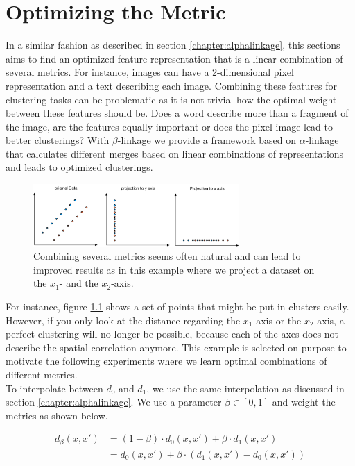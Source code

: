 \chapter{Optimizing the Metric}
\label{sec:beta}

In a similar fashion as described in section \ref{chapter:alphalinkage}, this sections aims to find an optimized feature representation that is a linear combination of several metrics. For instance, images can have a 2-dimensional pixel representation and a text describing each image. Combining these features for clustering tasks can be problematic as it is not trivial how the optimal weight between these features should be. Does a word describe more than a fragment of the image, are the features equally important or does the pixel image lead to better clusterings? With $\beta$-linkage we provide a framework based on $\alpha$-linkage that calculates different merges based on linear combinations of representations and leads to optimized clusterings.

\begin{figure}[h]
    \centering
    \includegraphics[width=0.7\textwidth]{images/ExampleDataset}
    \caption{Combining several metrics seems often natural and can lead to improved results as in this example where we project a dataset on the $x_1$- and the $x_2$-axis.}
    \label{fig:metrics}
\end{figure}

For instance, figure \ref{fig:metrics} shows a set of points that might be put in clusters easily. However, if you only look at the distance regarding the $x_1$-axis or the $x_2$-axis, a perfect clustering will no longer be possible, because each of the axes does not describe the spatial correlation anymore. This example is selected on purpose to motivate the following experiments where we learn optimal combinations of different metrics.\\ 

To interpolate between $d_0$ and $d_1$, we use the same interpolation as discussed in section \ref{chapter:alphalinkage}. We use a parameter $\beta \in [0,1]$ and weight the metrics as shown below.

\begin{align}
d_\beta(x,x') &= (1 - \beta) \cdot d_0(x,x') + \beta \cdot d_1(x,x') \nonumber \\
&= d_0(x,x') + \beta \cdot (d_1(x,x') - d_0(x,x'))
\label{eq:betalinkage}
\end{align}

